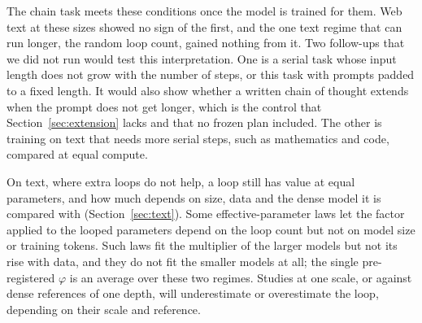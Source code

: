 The chain task meets these conditions once the model is trained for them. Web text at these sizes showed no sign of
the first, and the one text regime that can run longer, the random loop count, gained nothing from it. Two follow-ups
that we did not run would test this interpretation. One is a serial task whose input length does not grow with the
number of steps, or this task with prompts padded to a fixed length. It would also show whether a written chain of
thought extends when the prompt does not get longer, which is the control that Section~\ref{sec:extension} lacks and
that no frozen plan included. The other is training on text that needs more serial steps, such as mathematics and code,
compared at equal compute.

On text, where extra loops do not help, a loop still has value at equal parameters, and how much depends on size, data
and the dense model it is compared with (Section~\ref{sec:text}). Some effective-parameter laws let the factor applied to
the looped parameters depend on the loop count but not on model size or training tokens. Such laws fit the multiplier of
the larger models but not its rise with data, and they do not fit the smaller models at all; the single pre-registered
$\varphi$ is an average over these two regimes. Studies at one scale, or against dense references of one depth, will
underestimate or overestimate the loop, depending on their scale and reference.

